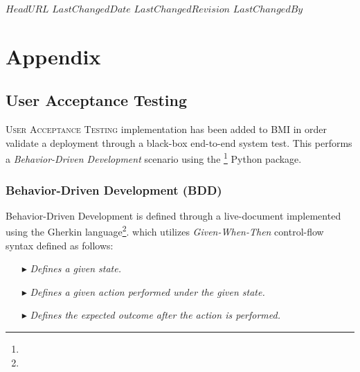 \svnidlong
{$HeadURL$}
{$LastChangedDate$}
{$LastChangedRevision$}
{$LastChangedBy$}

\chapter{Appendix}

\begin{introduction}
  
\end{introduction}

\section{User Acceptance Testing}

\lettrine[nindent=-1pt]{U}{ser Acceptance Testing} implementation has been added to BMI in order validate a deployment through a black-box end-to-end system test.  This performs a \emph{Behavior-Driven Development} scenario using the \footnote{} Python package.  

\subsection{Behavior-Driven Development (BDD)}

Behavior-Driven Development is defined through a live-document implemented using the Gherkin language\footnote{}. which utilizes \emph{Given-When-Then} control-flow syntax defined as follows: \\

\begin{itemize}
\item[\code{Given }$\blacktriangleright$\hspace{-12mm}] \hspace{10mm}\emph{Defines a given state.}
\item[\code{When }$\blacktriangleright$\hspace{-12mm}] \hspace{10mm}\emph{Defines a given action performed under the given state.}
\item[\code{Then }$\blacktriangleright$\hspace{-12mm}] \hspace{10mm}\emph{Defines the expected outcome after the action is performed.} \\
\end{itemize}

